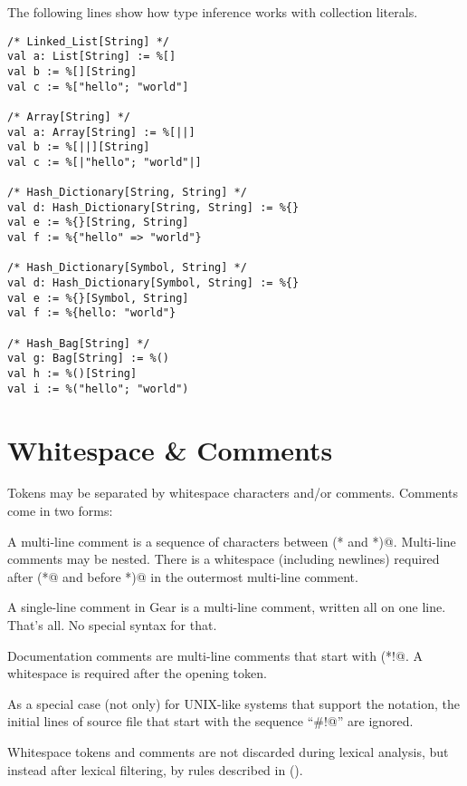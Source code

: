 \example The following lines show how type inference works with collection literals. 
\begin{lstlisting}
/* Linked_List[String] */
val a: List[String] := %[]
val b := %[][String]
val c := %["hello"; "world"]

/* Array[String] */
val a: Array[String] := %[||]
val b := %[||][String]
val c := %[|"hello"; "world"|]

/* Hash_Dictionary[String, String] */
val d: Hash_Dictionary[String, String] := %{}
val e := %{}[String, String]
val f := %{"hello" => "world"}

/* Hash_Dictionary[Symbol, String] */
val d: Hash_Dictionary[Symbol, String] := %{}
val e := %{}[Symbol, String]
val f := %{hello: "world"}

/* Hash_Bag[String] */
val g: Bag[String] := %()
val h := %()[String]
val i := %("hello"; "world")
\end{lstlisting}






\section{Whitespace \& Comments}
\label{sec:whitespacecomments}

Tokens may be separated by whitespace characters and/or comments. Comments come in two forms: 

A multi-line comment is a sequence of characters between \lstinline@(* and *)@. Multi-line comments may be nested. There is a whitespace (including newlines) required after \lstinline@(*@ and before \lstinline@*)@ in the outermost multi-line comment. 

A single-line comment in Gear is a multi-line comment, written all on one line. That's all. No special syntax for that. 

Documentation comments are multi-line comments that start with \lstinline@(*!@. A whitespace is required after the opening token. 

As a special case (not only) for UNIX-like systems that support the notation, the initial lines of source file that start with the sequence ``\lstinline@#!@'' are ignored. 

Whitespace tokens and comments are not discarded during lexical analysis, but instead after lexical filtering, by rules described in ().





